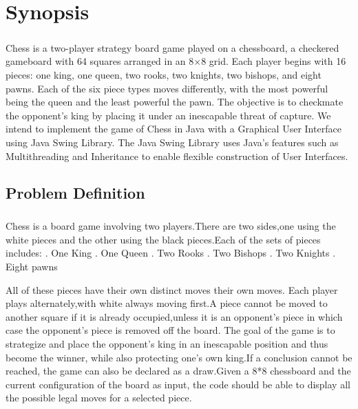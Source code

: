 \chapter{Synopsis}
\paragraph{}
Chess is a two-player strategy board game played on a chessboard, a checkered gameboard with 64 squares arranged in an 8×8 grid. Each player begins with 16 pieces: one king, one queen, two rooks, two knights, two bishops, and eight pawns. Each of the six piece types moves differently, with the most powerful being the queen and the least powerful the pawn. The objective is to checkmate the opponent's king by placing it under an inescapable threat of capture. We intend to implement the game of Chess in Java with a Graphical User Interface using Java Swing Library. The Java Swing Library uses Java's features such as Multithreading and Inheritance to enable flexible construction of User Interfaces.

\section{Problem Definition}
\paragraph{}
Chess is a board game involving two players.There are two sides,one using the white pieces and the other using the black pieces.Each of the sets of pieces includes:
. One King
. One Queen
. Two Rooks
. Two Bishops
. Two Knights
. Eight pawns

All of these pieces have their own distinct moves their own moves.
Each player plays alternately,with white always moving first.A piece cannot be moved to another square if it is already occupied,unless it is an opponent's piece in which case the opponent's piece is removed off the board.
The goal of the game is to strategize and place the opponent's king in an inescapable position and thus become the winner, while also protecting one's own king.If a conclusion cannot be reached, the game can also be declared as a draw.Given a 8*8 chessboard and the current configuration of the board as input, the code should be able to display all the possible legal moves for a selected piece.

